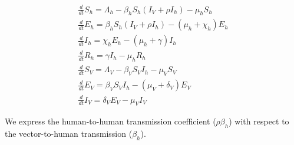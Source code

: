 \documentclass[10pt,letterpaper]{article}
\begin{document}
\begin{equation} \label{eq:zika_model}
\begin{array}{l}
\frac{d}{d t} S_{h}=\Lambda_{h}-\beta_{h} S_{h}\left(I_{V}+\rho I_{h}\right)-\mu_{h} S_{h} \\
\frac{d}{d t} E_{h}=\beta_{h} S_{h}\left(I_{V}+\rho I_{h}\right)-\left(\mu_{h}+\chi_{h}\right) E_{h} \\
\frac{d}{d t} I_{h}=\chi_{h} E_{h}-\left(\mu_{h}+\gamma\right) I_{h} \\
\frac{d}{d t} R_{h}=\gamma I_{h}-\mu_{h} R_{h} \\[2ex]
\frac{d}{d t} S_{V}=\Lambda_{V}-\beta_{V} S_{V} I_{h}-\mu_{V} S_{V} \\
\frac{d}{d t} E_{V}=\beta_{V} S_{V} I_{h}-\left(\mu_{V}+\delta_{V}\right) E_{V} \\
\frac{d}{d t} I_{V}=\delta_{V} E_{V}-\mu_{V} I_{V}
\end{array}
\end{equation}

We express the human-to-human transmission coefficient ($\rho \beta_h$) with respect to the vector-to-human transmission ($\beta_h$).
\end{document}
